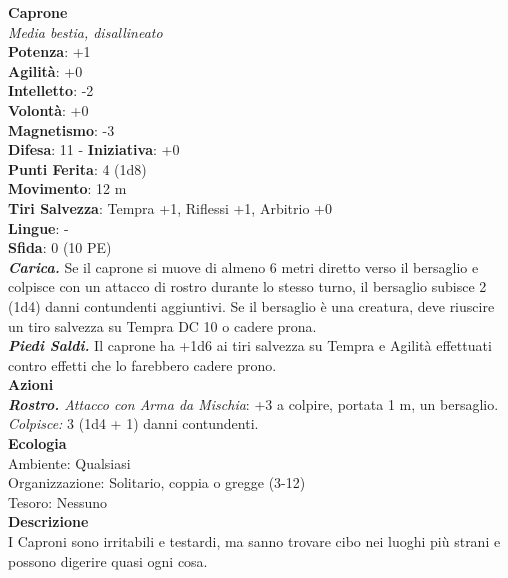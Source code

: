 \begin{multicols}{2}
\medskip\textbf{Caprone}\\
\emph{Media bestia, disallineato}\\
\textbf{Potenza}: +1\\
\textbf{Agilità}: +0\\
\textbf{Intelletto}: -2\\
\textbf{Volontà}: +0\\
\textbf{Magnetismo}: -3\\
\textbf{Difesa}: 11 - \textbf{Iniziativa}: +0\\
\textbf{Punti Ferita}: 4 (1d8)\\
\textbf{Movimento}: 12 m\\
\textbf{Tiri Salvezza}: Tempra +1, Riflessi +1, Arbitrio +0 \\
\textbf{Lingue}: -\\
\textbf{Sfida}: 0 (10 PE)\smallskip\\
\emph{\textbf{Carica.}} Se il caprone si muove di almeno 6 metri diretto verso il bersaglio e colpisce con un attacco di rostro durante lo stesso turno, il bersaglio subisce 2 (1d4) danni contundenti aggiuntivi. Se il bersaglio è una creatura, deve riuscire un tiro salvezza su Tempra DC 10 o cadere prona.\\
\emph{\textbf{Piedi Saldi.}} Il caprone ha +1d6 ai tiri salvezza su Tempra e Agilità effettuati contro effetti che lo farebbero cadere prono.  \\
\smallskip\textbf{Azioni}\\
\emph{\textbf{Rostro.} Attacco con Arma da Mischia}: +3 a colpire, portata 1 m, un bersaglio.\\
\emph{Colpisce:} 3 (1d4 + 1) danni contundenti.\\
\textbf{Ecologia}\\
Ambiente: Qualsiasi\\
Organizzazione: Solitario, coppia o gregge (3-12)\\
Tesoro: Nessuno\\
\textbf{Descrizione}\\
I Caproni sono irritabili e testardi, ma sanno trovare cibo nei luoghi più strani e possono digerire quasi ogni cosa. \\


\end{multicols}
